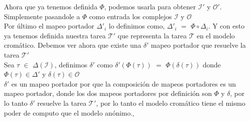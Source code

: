 \documentclass{article}
\begin{document}
\begin{enumerate}
{      Ahora que ya tenemos definida $\Phi$, podemos usarla para
      obtener $\mathcal{I}'$ y $\mathcal{O}'$. Simplemente pasandole a
      $\Phi$ como entrada los complejos $\mathcal{I}$ y
      $\mathcal{O}$\\

      Por último el mapeo portador $\Delta'_{i}$ lo definimos como,
      $\Delta'_{i}$ $=$ $\Phi \circ \Delta_{i}$. Y con esto ya tenemos
      definida nuestra tarea $\mathcal{T'}$ que representa la tarea
      $\mathcal{T}$ en el modelo cromático.
      Debemos ver ahora que existe una $\delta'$ mapeo portador que
      resuelve la tarea $\mathcal{T}'$\\
      Sea $\tau$ $\in$ $\Delta(\mathcal{I})$, definimos $\delta'$
      como $\delta'(\Phi(\tau))$ $=$ $\Phi(\delta(\tau))$ donde
      $\Phi(\tau) \in \Delta'$ y $\delta(\tau) \in \mathcal{O}$\\
      $\delta'$ es un mapeo portador por que la composición de mapeos
      portadores es un mapeo portador, donde los dos mapeos portadores
      por definición son $\Phi$ y $\delta$, por lo tanto $\delta'$
      resuelve la tarea $\mathcal{T'}$, por lo tanto el modelo
      cromático tiene el mismo poder de computo que el modelo anónimo.$_\square$\\
    }
    

\end{enumerate}
\end{document}
